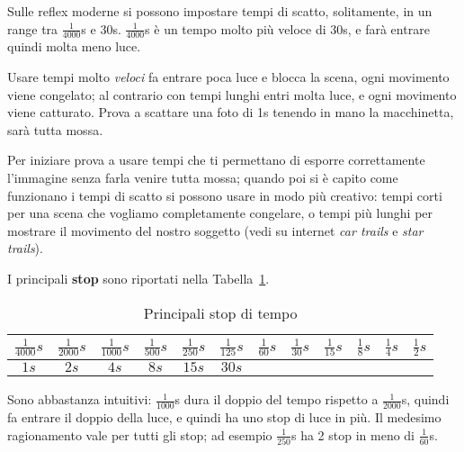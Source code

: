 Sulle reflex moderne si possono impostare tempi di scatto, solitamente, in un range tra $\frac{1}{4000}$s e 30s.\newline
$\frac{1}{4000}$s è un tempo molto più veloce di 30s, e farà entrare quindi molta meno luce.

Usare tempi molto \textit{veloci} fa entrare poca luce e blocca la scena, ogni movimento viene congelato; al contrario con tempi lunghi entri molta luce, e ogni movimento viene catturato. Prova a scattare una foto di 1s tenendo in mano la macchinetta, sarà tutta mossa.

Per iniziare prova a usare tempi che ti permettano di esporre correttamente l'immagine senza farla venire tutta mossa; quando poi si è capito come funzionano i tempi di scatto si possono usare in modo più creativo: tempi corti per una scena che vogliamo completamente congelare, o tempi più lunghi per mostrare il movimento del nostro soggetto (vedi su internet \textit{car trails} e \textit{star trails}).

I principali \textbf{stop} sono riportati nella Tabella~\ref{table:stop_time}.
\begin{table}[h]
    \centering
    \begin{tabular}{|c|c|c|c|c|c|c|c|c|c|c|c|} 
        \hline
        $\frac{1}{4000}s$ & $\frac{1}{2000}s$ & $\frac{1}{1000}s$ & $\frac{1}{500}s$ & $\frac{1}{250}s$                                & $\frac{1}{125}s$ & $\frac{1}{60}s$       & $\frac{1}{30}s$       & $\frac{1}{15}s$       & $\frac{1}{8}s$        & $\frac{1}{4}s$        & $\frac{1}{2}s$         \\[0.3cm] 
        \hline
        $1s$              & $2s$              & $4s$              & $8s$             & $15s$ & $30s$            & \multicolumn{1}{l|}{} & \multicolumn{1}{l|}{} & \multicolumn{1}{l|}{} & \multicolumn{1}{l|}{} & \multicolumn{1}{l|}{} & \multicolumn{1}{l|}{}  \\
        \hline
    \end{tabular}
    \caption{Principali stop di tempo}
    \label{table:stop_time}
\end{table}

Sono abbastanza intuitivi: $\frac{1}{1000}$s dura il doppio del tempo rispetto a $\frac{1}{2000}$s, quindi fa entrare il doppio della luce, e quindi ha uno stop di luce in più.\newline
Il medesimo ragionamento vale per tutti gli stop; ad esempio $\frac{1}{250}$s ha 2 stop in meno di $\frac{1}{60}$s.

